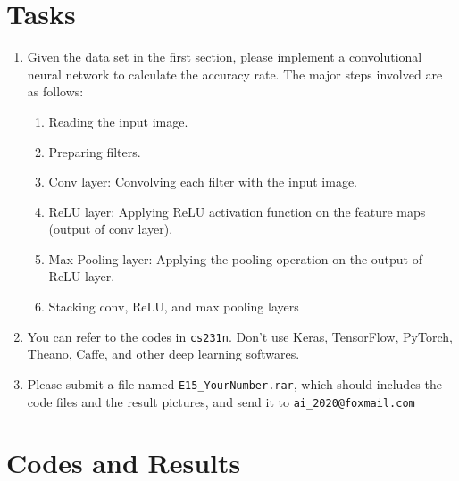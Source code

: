 \documentclass[a4paper, 11pt]{article}
\begin{document}
\section{Tasks}
\begin{enumerate}
	\item Given the data set in the first section, please implement a convolutional neural network to calculate the accuracy rate. The major steps involved are as follows:
	\begin{enumerate}
		\item Reading the input image.
		\item Preparing filters.
		\item Conv layer: Convolving each filter with the input image.
		\item ReLU layer: Applying ReLU activation function on the feature maps (output of conv layer).
		\item Max Pooling layer: Applying the pooling operation on the output of ReLU layer.
		\item Stacking conv, ReLU, and max pooling layers
	\end{enumerate}
	\item You can refer to the codes in \texttt{cs231n}. Don't use Keras, TensorFlow, PyTorch, Theano, Caffe, and other deep learning softwares. 
	\item Please submit a file named \texttt{E15\_YourNumber.rar}, which should includes the code files and the result pictures, and send it to \texttt{ai\_2020@foxmail.com}
\end{enumerate}



\section{Codes and Results}
\end{document}

